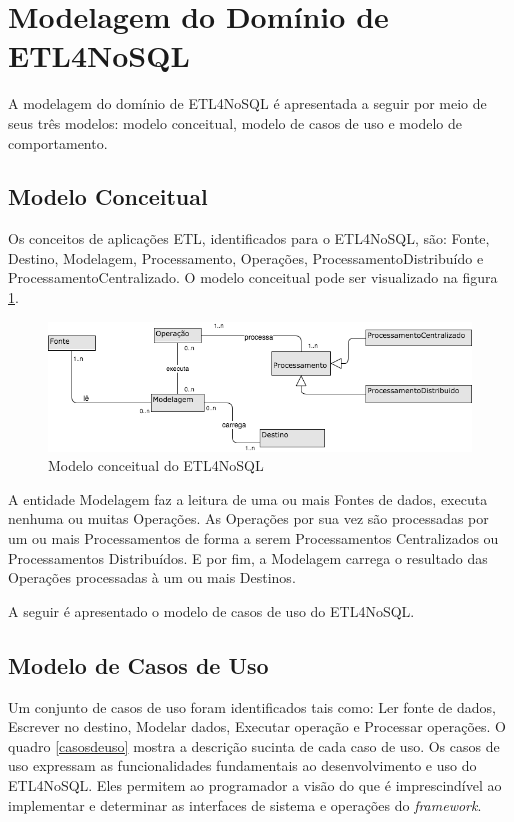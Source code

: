 \section{Modelagem do Domínio de ETL4NoSQL}

A modelagem do domínio de ETL4NoSQL é apresentada a seguir por meio de seus três modelos: modelo conceitual, modelo de casos de uso e modelo de comportamento.

\subsection{Modelo Conceitual}

Os conceitos de aplicações ETL, identificados para o ETL4NoSQL, são: Fonte, Destino, Modelagem, Processamento, Operações, ProcessamentoDistribuído e ProcessamentoCentralizado. O modelo conceitual pode ser visualizado na figura \ref{modeloconceitual}.

\begin{figure}[h]
	\centering
	\includegraphics[scale=0.6]{fig/modeloconceitual.png}
	\caption{Modelo conceitual do ETL4NoSQL}
	\label{modeloconceitual}
\end{figure}

A entidade Modelagem faz a leitura de uma ou mais Fontes de dados, executa nenhuma ou muitas Operações. As Operações por sua vez são processadas por um ou mais Processamentos de forma a serem Processamentos Centralizados ou Processamentos Distribuídos. E por fim, a Modelagem carrega o resultado das Operações processadas à um ou mais Destinos.

A seguir é apresentado o modelo de casos de uso do ETL4NoSQL.

\subsection{Modelo de Casos de Uso}

Um conjunto de casos de uso foram identificados tais como: Ler fonte de dados, Escrever no destino, Modelar dados, Executar operação e Processar operações. O quadro \ref{casosdeuso} mostra a descrição sucinta de cada caso de uso. Os casos de uso expressam as funcionalidades fundamentais ao desenvolvimento e uso do ETL4NoSQL. Eles permitem ao programador a visão do que é imprescindível ao implementar e determinar as interfaces de sistema e operações do \textit{framework}. 

